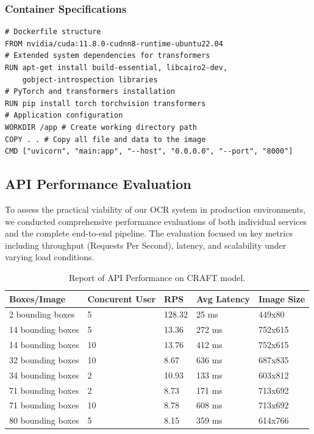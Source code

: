 {\subsubsection*{Container Specifications}

\begin{verbatim}
# Dockerfile structure
FROM nvidia/cuda:11.8.0-cudnn8-runtime-ubuntu22.04
# Extended system dependencies for transformers
RUN apt-get install build-essential, libcairo2-dev, 
    gobject-introspection libraries
# PyTorch and transformers installation
RUN pip install torch torchvision transformers
# Application configuration
WORKDIR /app # Create working directory path
COPY . . # Copy all file and data to the image
CMD ["uvicorn", "main:app", "--host", "0.0.0.0", "--port", "8000"]
\end{verbatim}


\subsection{API Performance Evaluation}
\label{subsec:api-performance-evaluation}


To assess the practical viability of our OCR system in production environments, we conducted 
comprehensive performance evaluations of both individual services and the complete end-to-end 
pipeline. The evaluation focused on key metrics including throughput (Requests Per Second), 
latency, and scalability under varying load conditions.


\begin{table}[H]
    \centering
    \caption{Report of API Performance on CRAFT model. }
    \renewcommand{\arraystretch}{1.5}
    \begin{tabular}{|p{3.5cm}|p{3.5cm}|p{1.5cm}|p{3.0cm}|p{2.7cm}|}
    \hline
    \textbf{Boxes/Image} & \textbf{Concurent User} & \textbf{RPS} & \textbf{Avg Latency} & \textbf{Image Size}\\
    \hline
    2 bounding boxes & 5 & 128.32 & 25 ms & 449x80\\
    \hline
    14 bounding boxes & 5 & 13.36 & 272 ms & 752x615\\
    \hline
    14 bounding boxes & 10 & 13.76 & 412 ms & 752x615\\
    \hline
    32 bounding boxes & 10 & 8.67 & 636 ms & 687x835\\
    \hline
    34 bounding boxes & 2 & 10.93 & 133 ms & 603x812\\
    \hline
    71 bounding boxes & 2 & 8.73 & 171 ms  & 713x692\\
    \hline
    71 bounding boxes & 10 & 8.78 & 608 ms & 713x692\\
    \hline
    80 bounding boxes & 5 & 8.15 & 359 ms & 614x766\\
    \hline
    \end{tabular}
    \label{tab:api_craft_performance_evaluation}
\end{table}


}
